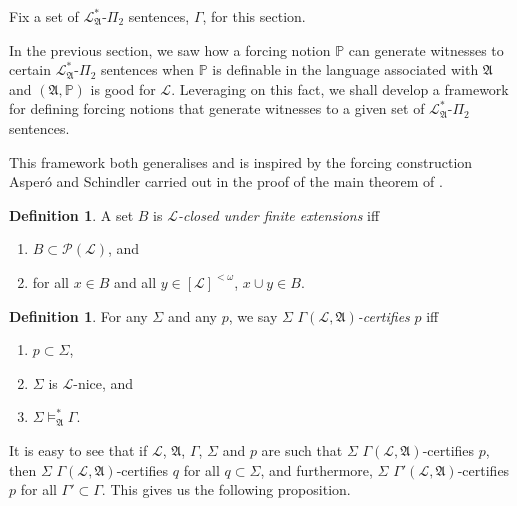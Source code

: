 \documentclass[12pt, twoside]{memoir}
\numberwithin{equation}{section}
\theoremstyle{definition}
\newtheorem{defi}[thm]{Definition}
\theoremstyle{remark}
\theoremstyle{definition}
\theoremstyle{definition}
\theoremstyle{definition}
\theoremstyle{remark}
\begin{document}
Fix a set of $\mathcal{L}^*_{\mathfrak{A}}$-$\Pi_2$ sentences, $\Gamma$, for this section.

In the previous section, we saw how a forcing notion $\mathbb{P}$ can generate witnesses to certain $\mathcal{L}^*_{\mathfrak{A}}$-$\Pi_2$ sentences when $\mathbb{P}$ is definable in the language associated with $\mathfrak{A}$ and $(\mathfrak{A}, \mathbb{P})$ is good for $\mathcal{L}$. Leveraging on this fact, we shall develop a framework for defining forcing notions that generate witnesses to a given set of $\mathcal{L}^*_{\mathfrak{A}}$-$\Pi_2$ sentences. 

This framework both generalises and is inspired by the forcing construction Asper\'{o} and Schindler carried out in the proof of the main theorem of \cite{schindler}.

\begin{defi}
A set $B$ is $\mathcal{L}$\emph{-closed under finite extensions} iff
\begin{enumerate}[label=(\alph*)]
    \item $B \subset \mathcal{P}(\mathcal{L})$, and
    \item for all $x \in B$ and all $y \in [\mathcal{L}]^{< \omega}$, $x \cup y \in B$.
\end{enumerate}
\end{defi}

\begin{defi}
For any $\Sigma$ and any $p$, we say $\Sigma$ $\Gamma(\mathcal{L}, \mathfrak{A})$\emph{-certifies} $p$ iff 
\begin{enumerate}[label=(\alph*)]
    \item $p \subset \Sigma$,
    \item $\Sigma$ is $\mathcal{L}$-nice, and
    \item $\Sigma \models^*_{\mathfrak{A}} \Gamma$.
\end{enumerate}
\end{defi}

It is easy to see that if $\mathcal{L}$, $\mathfrak{A}$, $\Gamma$, $\Sigma$ and $p$ are such that $\Sigma$ $\Gamma(\mathcal{L}, \mathfrak{A})$-certifies $p$, then $\Sigma$ $\Gamma(\mathcal{L}, \mathfrak{A})$-certifies $q$ for all $q \subset \Sigma$, and furthermore, $\Sigma$ $\Gamma'(\mathcal{L}, \mathfrak{A})$-certifies $p$ for all $\Gamma' \subset \Gamma$. This gives us the following proposition.
\end{document}
